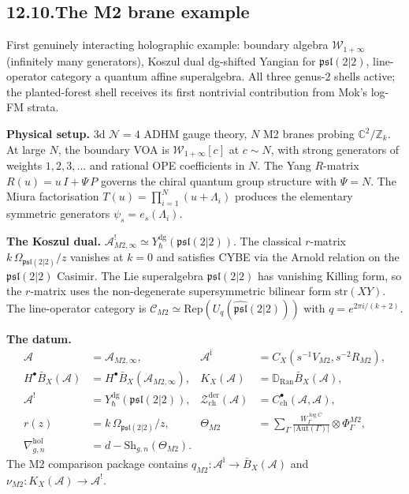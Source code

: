 \documentclass[11pt,reqno]{amsart}
\theoremstyle{definition}
\theoremstyle{remark}
\providecommand{\cA}{\mathcal{A}}
\providecommand{\cC}{\mathcal{C}}
\providecommand{\cN}{\mathcal{N}}
\providecommand{\cW}{\mathcal{W}}
\providecommand{\cZ}{\mathcal{Z}}
\providecommand{\barB}{\bar{B}}
\providecommand{\Ran}{\mathrm{Ran}}
\providecommand{\Aut}{\mathrm{Aut}}
\providecommand{\FM}{\overline{C}}
\providecommand{\hol}{\mathrm{hol}}
\providecommand{\bC}{\mathbb{C}}
\providecommand{\bZ}{\mathbb{Z}}
\providecommand{\Rep}{\mathrm{Rep}}
\providecommand{\dg}{\mathrm{dg}}
\providecommand{\der}{\mathrm{der}}
\providecommand{\ch}{\mathrm{ch}}
\numberwithin{equation}{section}
\begin{document}
\subsection*{12.10.\enspace The M2 brane example}

First genuinely interacting holographic example: boundary
algebra $\cW_{1+\infty}$ (infinitely many generators), Koszul
dual dg-shifted Yangian for $\mathfrak{psl}(2|2)$, line-operator
category a quantum affine superalgebra. All three genus-$2$
shells active; the planted-forest shell receives its first
nontrivial contribution from Mok's log-FM strata.

\medskip\noindent\textbf{Physical setup.}\enspace
3d $\cN = 4$ ADHM gauge theory, $N$ M2 branes
probing $\bC^2/\bZ_k$. At large $N$, the boundary VOA is
$\cW_{1+\infty}[c]$ at $c \sim N$, with strong generators of
weights $1, 2, 3, \ldots$ and rational OPE coefficients in $N$.
The Yang $R$-matrix $R(u) = u\,I + \Psi\,P$ governs the chiral
quantum group structure with $\Psi = N$. The Miura
factorisation $T(u) = \prod_{i=1}^N (u + \Lambda_i)$ produces
the elementary symmetric generators $\psi_s = e_s(\Lambda_i)$.

\medskip\noindent\textbf{The Koszul dual.}\enspace
$\cA^!_{M2,\infty} \simeq Y^{\dg}_\hbar(\mathfrak{psl}(2|2))$.
The classical $r$-matrix $k\,\Omega_{\mathfrak{psl}(2|2)}/z$
vanishes at $k = 0$ and satisfies CYBE via the Arnold relation
on the $\mathfrak{psl}(2|2)$ Casimir. The Lie superalgebra
$\mathfrak{psl}(2|2)$ has vanishing Killing form, so the
$r$-matrix uses the non-degenerate supersymmetric bilinear form
$\mathrm{str}(XY)$. The line-operator
category is
$\cC_{M2} \simeq \Rep(U_q(\widehat{\mathfrak{psl}}(2|2)))$
with $q = e^{2\pi i/(k+2)}$.

\medskip\noindent\textbf{The datum.}\enspace
\begin{align*}
\cA &= \cA_{M2,\infty},
 & \cA^{\mathrm i} &= C_X(s^{-1}V_{M2},s^{-2}R_{M2}),\\
H^\bullet\barB_X(\cA)&=H^\bullet\barB_X(\cA_{M2,\infty}),
 &K_X(\cA)&=\mathbb D_{\Ran}\barB_X(\cA),\\
\cA^! &= Y^{\dg}_\hbar(\mathfrak{psl}(2|2)),
 & \cZ^{\der}_{\ch}(\cA) &= C^\bullet_{\ch}(\cA,\cA),\\
r(z) &= k\,\Omega_{\mathfrak{psl}(2|2)}/z,
 & \Theta_{M2} &= \sum_\Gamma
 \tfrac{W^{\log\FM}_\Gamma}{|\Aut(\Gamma)|}\otimes\Phi^{M2}_\Gamma,\\
\nabla^{\hol}_{g,n} &= d - \mathrm{Sh}_{g,n}(\Theta_{M2}).
\end{align*}
The M2 comparison package contains
$q_{M2}\colon\cA^{\mathrm i}\to\barB_X(\cA)$ and
$\nu_{M2}\colon K_X(\cA)\to\cA^!$.
\end{document}

